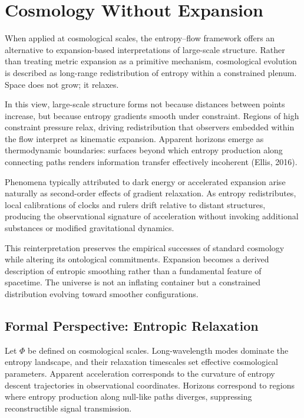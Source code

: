 \documentclass[11pt]{article}
\begin{document}
\section{Cosmology Without Expansion}

When applied at cosmological scales, the entropy–flow framework offers an alternative to expansion-based interpretations of large-scale structure. Rather than treating metric expansion as a primitive mechanism, cosmological evolution is described as long-range redistribution of entropy within a constrained plenum. Space does not grow; it relaxes.

In this view, large-scale structure forms not because distances between points increase, but because entropy gradients smooth under constraint. Regions of high constraint pressure relax, driving redistribution that observers embedded within the flow interpret as kinematic expansion. Apparent horizons emerge as thermodynamic boundaries: surfaces beyond which entropy production along connecting paths renders information transfer effectively incoherent (Ellis, 2016).

Phenomena typically attributed to dark energy or accelerated expansion arise naturally as second-order effects of gradient relaxation. As entropy redistributes, local calibrations of clocks and rulers drift relative to distant structures, producing the observational signature of acceleration without invoking additional substances or modified gravitational dynamics.

This reinterpretation preserves the empirical successes of standard cosmology while altering its ontological commitments. Expansion becomes a derived description of entropic smoothing rather than a fundamental feature of spacetime. The universe is not an inflating container but a constrained distribution evolving toward smoother configurations.

\subsection*{Formal Perspective: Entropic Relaxation}

Let $\Phi$ be defined on cosmological scales. Long-wavelength modes dominate the entropy landscape, and their relaxation timescales set effective cosmological parameters. Apparent acceleration corresponds to the curvature of entropy descent trajectories in observational coordinates. Horizons correspond to regions where entropy production along null-like paths diverges, suppressing reconstructible signal transmission.
\end{document}
